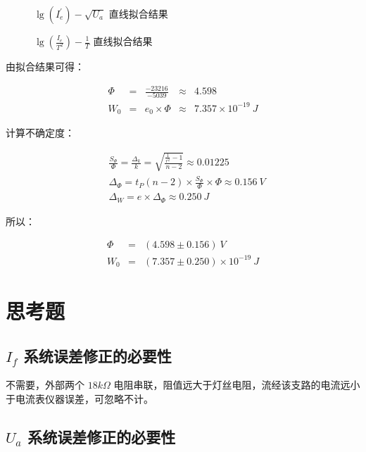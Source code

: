\documentclass[a4paper]{article}
\begin{document}
\begin{figure}[H]
	\centering
    \caption{$\lg(I_e^\prime)-\sqrt{U_a}$ 直线拟合结果}
\end{figure}

\begin{figure}[H]
	\centering
    \caption{$\lg(\frac{I_e}{T^2})-\frac{1}{T}$ 直线拟合结果}
\end{figure}

\par 由拟合结果可得：

$$
\begin{array}{rcccl}
	\Phi&=&\frac{-23216}{-5039}&\approx&4.598\\
	W_0&=&e_0\times \Phi&\approx&7.357\times 10^{-19}\ J
\end{array}
$$

\par 计算不确定度：

$$
\begin{array}{cl}
	&\frac{S_\Phi}{\Phi}=\frac{\Delta_k}{k}=\sqrt{\frac{\frac{1}{r^2}-1}{n-2}}\approx 0.01225\\
	&\Delta_\Phi=t_P(n-2)\times \frac{S_\Phi}{\Phi}\times \Phi\approx 0.156\ V\\
	&\Delta_W=e\times\Delta_\Phi\approx 0.250\ J
\end{array}
$$

\par 所以：

$$
\begin{array}{rcl}
	\Phi&=&(4.598\pm 0.156)\ V\\
	W_0&=&(7.357\pm 0.250)\times 10^{-19}\ J
\end{array}
$$

\section{思考题}

\subsection{$I_f$ 系统误差修正的必要性}

\par 不需要，外部两个 $18k\Omega$ 电阻串联，阻值远大于灯丝电阻，流经该支路的电流远小于电流表仪器误差，可忽略不计。

\subsection{$U_a$ 系统误差修正的必要性}
\end{document}
